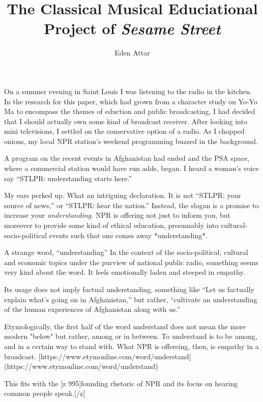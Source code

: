 \documentclass[12pt,letterpaper]{article}
\begin{document}
	
	\title{The Classical Musical Educiational Project of \textit{Sesame Street}}
	\author{Eden Attar}
	\maketitle
	
	\doublespacing
	\thispagestyle{empty}

	\noindent
	On a summer evening in Saint Louis I was listening to the radio in
	the kitchen. In the research for this paper, which had grown from a character
	study on Yo-Yo Ma to encompass the themes of eduction and public broadcasting,
	I had decided that I should actually own some kind of broadcast receiver. 
	After looking into mini televisions, I settled on the conservative option
	of a radio. As I chopped onions, my local NPR station's weekend programming
	buzzed in the background.
	
	A program on the recent events in Afghanistan had ended and the PSA 
	space, where a commercial station
	would have run adds, began. I heard a woman's voice say ``STLPR: understanding
	starts here.'' 

	My ears perked up. What an intriguing declaration. It is not ``STLPR:
	your source of news,'' or ``STLPR: hear the nation.'' Instead, the 
	slogan is a 
	promise to increase your \textit{understanding. }NPR is offering not
	just to 
	inform you, but moreover to provide some kind of ethical education,
	presumably into cultural-socio-political events such that one comes away
	*understanding*. 

	A strange word, ``understanding'' In the context of the socio-political,
	cultural and economic topics under the purview of national public 
	radio, something seems very kind about the word. It feels emotionally
	laden and steeped in empathy. 

	Its usage does not imply factual understanding, something like ``Let
	us factually explain what's going on in Afghanistan,'' but rather, 
	``cultivate an understanding of the human experiences of Afghanistan 
	along with us.'' 


Etymologically, the first half of the word understand does not mean the more modern "below" but rather, among or in between. To understand is to be among, and in a certain way to stand with. What NPR is offereing, then, is empathy in a broadcast. [https://www.etymonline.com/word/understand](https://www.etymonline.com/word/understand)


	This fits with the [z 995]founding rhetoric of NPR and its focus on hearing common people speak.[/z]
	

\printbibliography
\end{document}
